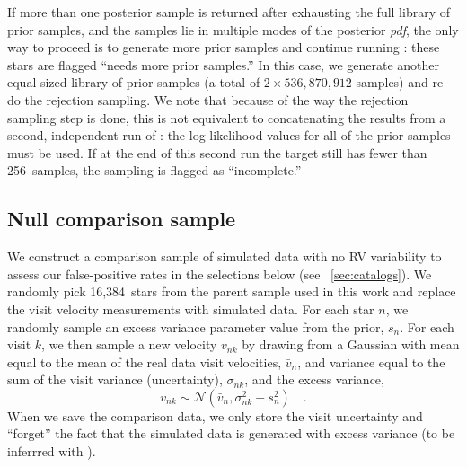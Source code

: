 \documentclass[modern, letterpaper]{aastex62}
\newcommand{\thejoker}{\project{The~Joker}}
\newcommand{\pdf}{\textit{pdf}}
\newcommand{\nprior}{536,870,912}
\newcommand{\nposterior}{256}
\newcommand{\ncontrol}{16,384}
\begin{document}
If more than one posterior sample is returned after exhausting the full library
of prior samples, and the samples lie in multiple modes of the posterior \pdf,
the only way to proceed is to generate more prior samples and continue running
\thejoker: these stars are flagged ``needs more prior samples.''
In this case, we generate another equal-sized library of prior samples (a total
of $2\times\nprior$ samples) and re-do the rejection sampling.
We note that because of the way the rejection sampling step is done, this is not
equivalent to concatenating the results from a second, independent run of
\thejoker: the log-likelihood values for all of the prior samples must be used.
If at the end of this second run the target still has fewer than \nposterior\
samples, the sampling is flagged as ``incomplete.''

\subsection{Null comparison sample}
\label{sec:control-sample}

We construct a comparison sample of simulated data with no RV variability to
assess our false-positive rates in the selections below (see
\sectionname~\ref{sec:catalogs}).
We randomly pick \ncontrol\ stars from the parent sample used in this work and
replace the visit velocity measurements with simulated data.
For each star $n$, we randomly sample an excess variance parameter value from
the prior, $s_n$.
For each visit $k$, we then sample a new velocity $v_{nk}$ by drawing from a
Gaussian with mean equal to the mean of the real data visit velocities,
$\bar{v}_n$, and variance equal to the sum of the visit variance (uncertainty),
$\sigma_{nk}$, and the excess variance,
\begin{equation}
    v_{nk} \sim \mathcal{N}(\bar{v}_n, \sigma_{nk}^2 + s_n^2) \quad .
\end{equation}
When we save the comparison data, we only store the visit uncertainty and
``forget'' the fact that the simulated data is generated with excess variance
(to be inferrred with \thejoker).


%

%
\end{document}
